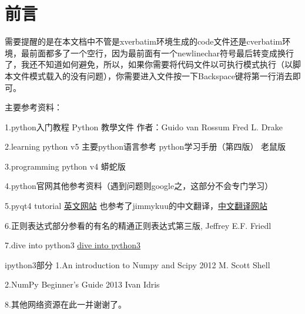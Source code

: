 \documentclass[12pt,oneside]{book}
\begin{document}
\frontmatter

\author{万泽}
\titleLB

\chapter*{前言}
\begin{common-format}
需要提醒的是在本文档中不管是xverbatim环境生成的code文件还是cverbatim环境，最前面都多了一个空行，因为最前面有一个newlinechar符号最后转变成换行了，我还不知道如何避免，所以，如果你需要将代码文件以可执行模式执行（以脚本文件模式载入的没有问题），你需要进入文件按一下Backspace键将第一行消去即可。

主要参考资料：

1.python入门教程 Python 教學文件 作者：Guido van Rossum  Fred L. Drake

2.learning python v5  主要python语言参考   python学习手册（第四版） 老鼠版

3.programming python v4 蟒蛇版

4.python官网其他参考资料（遇到问题则google之，这部分不会专门学习）

5.pyqt4 tutorial \href{http://zetcode.com/gui/pyqt4/}{英文网站} 也参考了jimmykuu的中文翻译，\href{http://blog.cx125.com/books/PyQt4_Tutorial/}{中文翻译网站}

6.正则表达式部分参看的有名的精通正则表达式第三版, Jeffrey E.F. Friedl 

7.dive into python3 \href{http://www.diveintopython3.net/index.html}{dive into python3}



ipython3部分
1.An introduction to Numpy and Scipy  2012 M. Scott Shell

2.NumPy Beginner's Guide 2013 Ivan Idris

8.其他网络资源在此一并谢谢了。


\end{common-format}


\setcounter{tocdepth}{2}
\tableofcontents
\end{document}
